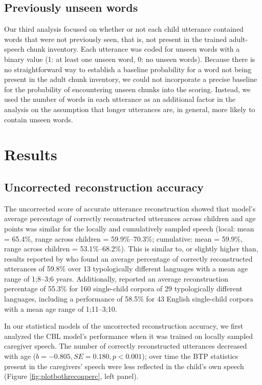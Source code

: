 \documentclass{article}
\begin{document}
\subsection{Previously unseen words}
Our third analysis focused on whether or not each child utterance contained words that were not previously seen, that is, not present in the trained adult-speech chunk inventory. Each utterance was coded for unseen words with a binary value (1: at least one unseen word, 0: no unseen words). Because there is no straightforward way to establish a baseline probability for a word not being present in the adult chunk inventory, we could not incorporate a precise baseline for the probability of encountering unseen chunks into the scoring. Instead, we used the number of words in each utterance as an additional factor in the analysis on the assumption that longer utterances are, in general, more likely to contain unseen words. 

\section{Results}

\subsection{Uncorrected reconstruction accuracy}

The uncorrected score of accurate utterance reconstruction \cite{mccauley2011learning, mccauley2014acquiring} showed that model's average percentage of correctly reconstructed utterances across children and age points was similar for the locally and cumulatively sampled speech (local: mean = 65.4\%, range across children = 59.9\%--70.3\%; cumulative: mean = 59.9\%, range across children = 53.1\%--68.2\%). This is similar to, or slightly higher than, results reported by  who found an average percentage of correctly reconstructed utterances of 59.8\% over 13 typologically different languages with a mean age range of 1;8--3;6 years. Additionally,  reported an average reconstruction percentage of 55.3\% for 160 single-child corpora of 29 typologically different languages, including a performance of 58.5\% for 43 English single-child corpora with a mean age range of 1;11--3;10.

In our statistical models of the uncorrected reconstruction accuracy, we first analyzed the CBL model's performance when it was trained on locally sampled caregiver speech. The number of correctly reconstructed utterances decreased with age ($b = -0.805, SE = 0.180, p < 0.001$); over time the BTP statistics present in the caregivers' speech were less reflected in the child's own speech (Figure \ref{fig:plotbothreconperc}, left panel).
\end{document}
